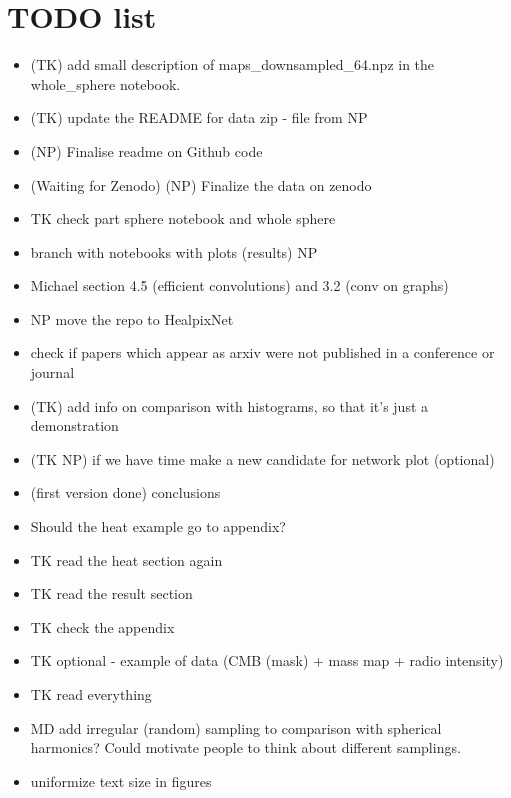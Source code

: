 \documentclass[final,twocolumn,3p,times,authoryear]{elsarticle}
\newcommand{\1}{\b{1}}              %
\newcommand{\0}{\b{0}}              %
\begin{document}
\section{TODO list}
\begin{itemize}[noitemsep,topsep=0pt,parsep=0pt,partopsep=0pt]
    \item (TK) add small description of maps\_downsampled\_64.npz in the whole\_sphere notebook.
    \item (TK) update the README for data zip - file from NP
    \item (NP) Finalise readme on Github code
    \item (Waiting for Zenodo) (NP) Finalize the data on zenodo
    \item TK check part sphere notebook and whole sphere
    \item branch with notebooks with plots (results) NP
    \item Michael section 4.5 (efficient convolutions) and 3.2 (conv on graphs)
    \item NP move the repo to HealpixNet
	\item check if papers which appear as arxiv were not published in a conference or journal
    \item (TK) add info on comparison with histograms, so that it's just a demonstration
    \item (TK NP) if we have time make a new candidate for network plot (optional)
    \item (first version done) conclusions
    \item Should the heat example go to appendix?
    \item TK read the heat section again
    \item TK read the result section
    \item TK check the appendix
    \item TK optional - example of data (CMB (mask) + mass map + radio intensity)
    \item TK read everything
	\item MD add irregular (random) sampling to comparison with spherical harmonics? Could motivate people to think about different samplings.
	\item uniformize text size in figures
\end{itemize}
\end{document}
